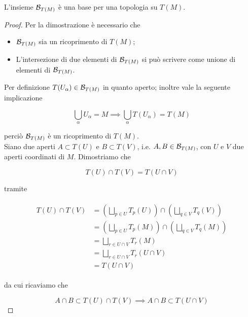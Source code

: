 \begin{definition}
	L'insieme $ \mathcal{B}_{T(M)} $ è una base per una topologia su $ T(M) $.
\end{definition}

\begin{proof}
	Per la dimostrazione è necessario che
	
	\begin{itemize}
		\item $ \mathcal{B}_{T(M)} $ sia un ricoprimento di $ T(M) $;
		
		\item L'intersezione di due elementi di $ \mathcal{B}_{T(M)} $ si può scrivere come unione di elementi di $ \mathcal{B}_{T(M)} $.
	\end{itemize}

	Per definizione $ T(U_{\alpha}) \in \mathcal{B}_{T(M)} $ in quanto aperto; inoltre vale la seguente implicazione
	
	\begin{equation}
		\bigcup_{\alpha} U_{\alpha} = M %
		\implies %
		\bigcup_{\alpha} T(U_{\alpha}) = T(M)
	\end{equation}

	perciò $ \mathcal{B}_{T(M)} $ è un ricoprimento di $ T(M) $.\\
	Siano due aperti $ A \subset T(U) $ e $ B \subset T(V) $, i.e. $ A,B \in \mathcal{B}_{T(M)} $, con $ U $ e $ V $ due aperti coordinati di $ M $. Dimostriamo che
	
	\begin{equation}
		T(U) \cap T(V) = T(U \cap V)
	\end{equation}

	tramite
	
	\begin{align}
		\begin{split}
			T(U) \cap T(V) &= \left( \bigsqcup_{p \in U} T_{p}(U) \right) \cap \left( \bigsqcup_{q \in V} T_{q}(V) \right)\\
			&= \left( \bigsqcup_{p \in U} T_{p}(M) \right) \cap \left( \bigsqcup_{q \in V} T_{q}(M) \right)\\
			&= \bigsqcup_{r \in U \cap V} T_{r}(M)\\
			&= \bigsqcup_{r \in U \cap V} T_{r}(U \cap V)\\
			&= T(U \cap V)
		\end{split}
	\end{align}
	
	da cui ricaviamo che
	
	\begin{equation}
		A \cap B \subset T(U) \cap T(V) %
		\implies %
		A \cap B \subset T(U \cap V)
	\end{equation}


\end{proof}
